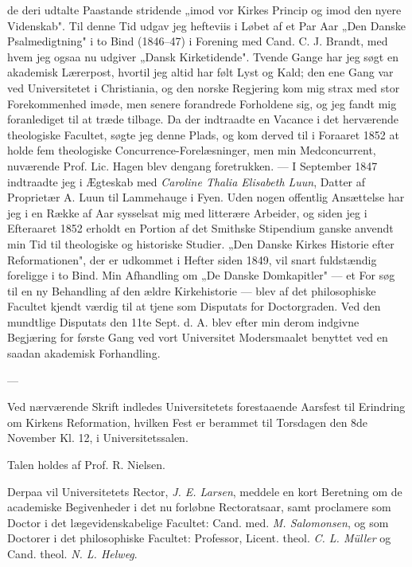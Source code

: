 \documentclass[12pt,a4paper]{article}
\newcommand{\opage}[1]{\marginnote{\footnotesize\textit{[#1]}}}
\begin{document}
de deri udtalte Paastande stridende „imod vor Kirkes Princip og imod den nyere
Videnskab". Til denne Tid udgav jeg hefteviis i Løbet af et Par Aar „Den Danske
Psalmedigtning" i to Bind (1846--47) i Forening med Cand. C. J. Brandt, med hvem
jeg ogsaa nu udgiver „Dansk Kirketidende". Tvende Gange har jeg søgt en akademisk
Lærerpost, hvortil jeg altid har følt Lyst og Kald; den ene Gang var ved
Universitetet i Christiania, og den norske Regjering kom mig strax med stor
Forekommenhed imøde, men senere forandrede Forholdene sig, og jeg fandt mig
foranlediget til at træde tilbage. Da der indtraadte en Vacance i det herværende
theologiske Facultet, søgte jeg denne Plads, og kom derved til i Foraaret 1852 at
holde fem theologiske Concurrence-Forelæsninger, men min Medconcurrent, nuværende
Prof. Lic. Hagen blev dengang foretrukken. --- I September 1847 indtraadte jeg i
Ægteskab med \emph{Caroline Thalia Elisabeth Luun}, Datter af Proprietær A. Luun
til Lammehauge i Fyen. Uden nogen offentlig Ansættelse har jeg i en Række af Aar
sysselsat mig med litterære Arbeider, og siden jeg i Efteraaret 1852 erholdt en
Portion af det Smithske Stipendium ganske anvendt min Tid til theologiske og
historiske Studier. „Den Danske Kirkes Historie efter Reformationen", der er
udkommet i Hefter siden 1849, vil snart fuldstændig foreligge i to Bind. Min
Afhandling om „De Danske Domkapitler" --- et For%
\opage{46}søg til en ny Behandling af den ældre Kirkehistorie --- blev af det philosophiske
Facultet kjendt værdig til at tjene som Disputats for Doctorgraden. Ved den
mundtlige Disputats den 11te Sept. d. A. blev efter min derom indgivne Begjæring
for første Gang ved vort Universitet Modersmaalet benyttet ved en saadan akademisk
Forhandling.

\begin{center}---\end{center}

Ved nærværende Skrift indledes Universitetets forestaaende Aarsfest til Erindring
om Kirkens Reformation, hvilken Fest er berammet til Torsdagen den 8de November
Kl. 12, i Universitetssalen.

Talen holdes af Prof. R. Nielsen.

Derpaa vil Universitetets Rector, \emph{J. E. Larsen}, meddele en kort Beretning
om de academiske Begivenheder i det nu forløbne Rectoratsaar, samt proclamere som
Doctor i det lægevidenskabelige Facultet: Cand. med. \emph{M. Salomonsen}, og som
Doctorer i det philosophiske Facultet: Professor, Licent. theol. \emph{C. L.
Müller} og Cand. theol. \emph{N. L. Helweg}.
\end{document}
